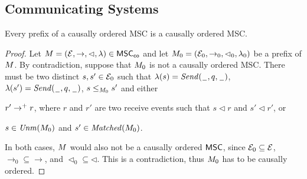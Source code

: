 \documentclass{article}
\begin{document}

\subsection{Communicating Systems}

\begin{lemma}
\label{lem:co-prefix}
Every prefix of a causally ordered MSC is a causally ordered MSC.
\end{lemma}
\begin{proof}

Let $M = (\mathcal{E}, \to, \lhd, \lambda) \in \mathsf{MSC}_{\mathsf{co}}$ and let $M_0 =
(\mathcal{E}_0, \to_0, \lhd_0, \lambda_0)$ be a prefix of $M$. By contradiction, suppose that $M_0$ is not a	causally ordered MSC. There must be two distinct $s,s' \in \mathcal{E}_0$ such that $\lambda(s)={\mathit{Send}(\hspace{0.1em}\underline{\hspace{0.5em}}\hspace{0.1em},q,\hspace{0.1em}\underline{\hspace{0.5em}}\hspace{0.1em})}$, $\lambda(s')={\mathit{Send}(\hspace{0.1em}\underline{\hspace{0.5em}}\hspace{0.1em},q,\hspace{0.1em}\underline{\hspace{0.5em}}\hspace{0.1em})}$, $s \le_{M_0} s'$ and either
\begin{enumerate*}[label={(\roman*)}]
	\item $r' \to^+ r$, where $r$ and $r'$ are two receive events such that $s \lhd r$ and $s' \lhd r'$, or
	\item $s \in \mathit{Unm}(M_0)$ and $s' \in \mathit{Matched}(M_0)$.
\end{enumerate*}
In both cases, $M$ would also not be a causally ordered $\mathsf{MSC}$, since $\mathcal{E}_0 \subseteq \mathcal{E}$, ${\rightarrow_0} \subseteq {\rightarrow}$, and ${\lhd_0} \subseteq {\lhd}$. This is a contradiction, thus $M_0$ has to be causally ordered.
\end{proof}
\end{document}
